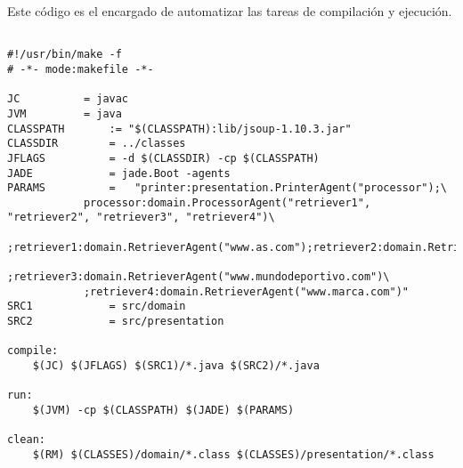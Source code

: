 \documentclass{pre-tfg}
\begin{document}
Este código es el encargado de automatizar las tareas de compilación y ejecución.

\begin{lstlisting}[caption=Código que automatiza la tarea de compilación y ejecución,style=makefile]

#!/usr/bin/make -f
# -*- mode:makefile -*-

JC 			= javac
JVM			= java
CLASSPATH		:= "$(CLASSPATH):lib/jsoup-1.10.3.jar"
CLASSDIR 		= ../classes
JFLAGS 			= -d $(CLASSDIR) -cp $(CLASSPATH)
JADE 			= jade.Boot -agents
PARAMS 			= 	"printer:presentation.PrinterAgent("processor");\
			processor:domain.ProcessorAgent("retriever1", "retriever2", "retriever3", "retriever4")\
			;retriever1:domain.RetrieverAgent("www.as.com");retriever2:domain.RetrieverAgent("www.sports.es")\
			;retriever3:domain.RetrieverAgent("www.mundodeportivo.com")\
			;retriever4:domain.RetrieverAgent("www.marca.com")" 
SRC1 			= src/domain
SRC2			= src/presentation

compile:
	$(JC) $(JFLAGS) $(SRC1)/*.java $(SRC2)/*.java

run:
	$(JVM) -cp $(CLASSPATH) $(JADE) $(PARAMS)

clean:
	$(RM) $(CLASSES)/domain/*.class $(CLASSES)/presentation/*.class

\end{lstlisting}

\clearpage


\singlespacing

\end{document}
